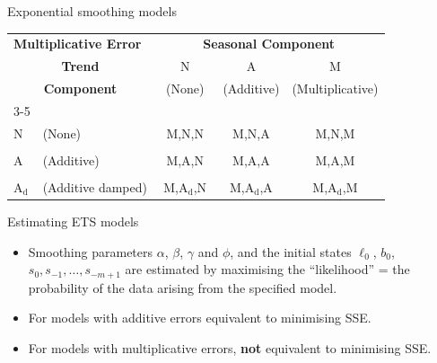 \documentclass[
  14pt,
  ignorenonframetext,
  aspectratio=169,
]{beamer}
\providecommand{\tightlist}{%
  \setlength{\itemsep}{0pt}\setlength{\parskip}{0pt}}
\def\damped{$_\text{d}$}
\begin{document}
\begin{frame}{Exponential smoothing models}
\begin{block}{}
\begin{tabular}{ll|ccc}
  \multicolumn{2}{l}{\alert{\bf Multiplicative Error}} &     \multicolumn{3}{c}{\bf Seasonal Component}      \\
             \multicolumn{2}{c|}{\bf Trend}            &      N       &         A         &        M         \\
           \multicolumn{2}{c|}{\bf Component}          &   ~(None)~   &    (Additive)     & (Multiplicative) \\ \cline{3-5}
           &                                           &              &                   &  \\[-0.3cm]
  N        & (None)                                    &    M,N,N     &       M,N,A       &      M,N,M       \\
           &                                           &              &                   &  \\[-0.3cm]
  A        & (Additive)                                &    M,A,N     &       M,A,A       &      M,A,M       \\
           &                                           &              &                   &  \\[-0.3cm]
  A\damped & (Additive damped)                         & M,A\damped,N &   M,A\damped,A    &   M,A\damped,M
\end{tabular}
\end{block}
\end{frame}

\begin{frame}{Estimating ETS models}
\protect{}\label{estimating-ets-models}
\begin{itemize}
\tightlist
\item
  Smoothing parameters \(\alpha\), \(\beta\), \(\gamma\) and \(\phi\),
  and the initial states \(\ell_0\), \(b_0\),
  \(s_0,s_{-1},\dots,s_{-m+1}\) are estimated by maximising the
  ``likelihood'' = the probability of the data arising from the
  specified model.
\item
  For models with additive errors equivalent to minimising SSE.
\item
  For models with multiplicative errors, \textbf{not} equivalent to
  minimising SSE.
\end{itemize}
\end{frame}
\end{document}
